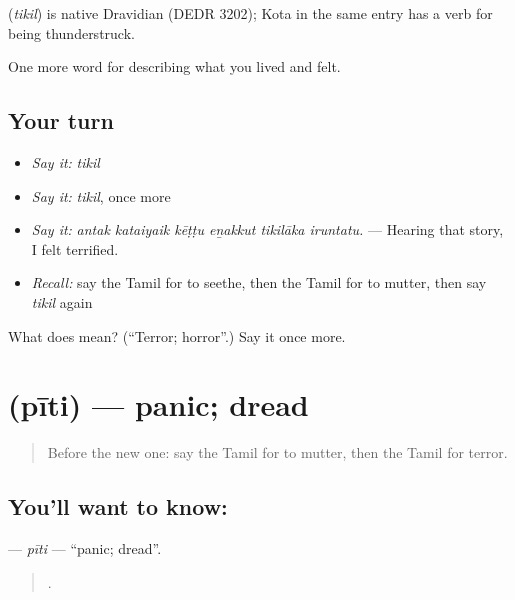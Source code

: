 \begin{cousinweb}
\textbf{} (\emph{tikil}) is native Dravidian (DEDR 3202); Kota in the same entry has a verb for being thunderstruck.
\end{cousinweb}

\begin{grammarlens}[title={What you've built}]
One more word for describing what you lived and felt.
\end{grammarlens}

\subsection*{Your turn}
\begin{itemize}
\raggedright
  \item \emph{Say it:} \emph{tikil}
  \item \emph{Say it:} \emph{tikil}, once more
  \item \emph{Say it:} \emph{antak kataiyaik kēṭṭu eṉakkut tikilāka iruntatu.} — Hearing that story, I felt terrified.
  \item \emph{Recall:} say the Tamil for to seethe, then the Tamil for to mutter, then say \emph{tikil} again
\end{itemize}

\begin{tcolorbox}[breakable,colback=teal!4,colframe=teal!35!black,title={Before you move on}]
What does  mean? (\textquotedblleft{}Terror; horror\textquotedblright{}.) Say it once more.
\end{tcolorbox}
\section[\texorpdfstring{\ta{பீதி} (pīti)}{பீதி (pīti)}]{ (pīti) — panic; dread}

\label{lesson:TA-C454-piti}



\begin{quote}
Before the new one: say the Tamil for to mutter, then the Tamil for terror.
\end{quote}

\subsection*{You'll want to know: }
\textbf{} — \emph{pīti} — \textquotedblleft{}panic; dread\textquotedblright{}.

\begin{quote}
   .
\end{quote}

